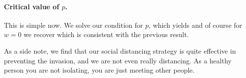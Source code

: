 \paragraph{Critical value of $p$.}
This is simple now. We solve our condition for $p$, which yields 
and of course for $w=0$ we recover  
which is consistent with the previous result. 

As a side note, we find that our social distancing strategy is quite effective in preventing the invasion, and we are not even really distancing. As a healthy person you are not isolating, you are just meeting other people. 

